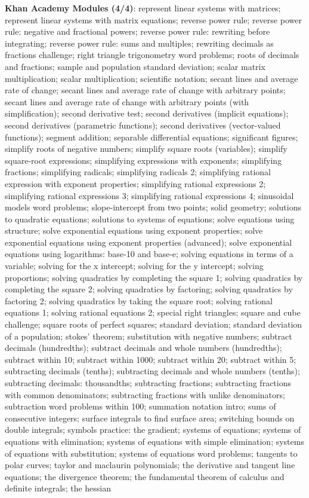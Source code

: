 \documentclass{article}
\begin{document}
\begin{figure*}
\textbf{Khan Academy Modules (4/4)}:
represent linear systems with matrices; represent linear systems with matrix equations; reverse power rule; reverse power rule: negative and fractional powers; reverse power rule: rewriting before integrating; reverse power rule: sums and multiples; rewriting decimals as fractions challenge; right triangle trigonometry word problems; roots of decimals and fractions; sample and population standard deviation; scalar matrix multiplication; scalar multiplication; scientific notation; secant lines and average rate of change; secant lines and average rate of change with arbitrary points; secant lines and average rate of change with arbitrary points (with simplification); second derivative test; second derivatives (implicit equations); second derivatives (parametric functions); second derivatives (vector-valued functions); segment addition; separable differential equations; significant figures; simplify roots of negative numbers; simplify square roots (variables); simplify square-root expressions; simplifying expressions with exponents; simplifying fractions; simplifying radicals; simplifying radicals 2; simplifying rational expression with exponent properties; simplifying rational expressions 2; simplifying rational expressions 3; simplifying rational expressions 4; sinusoidal models word problems; slope-intercept from two points; solid geometry; solutions to quadratic equations; solutions to systems of equations; solve equations using structure; solve exponential equations using exponent properties; solve exponential equations using exponent properties (advanced); solve exponential equations using logarithms: base-10 and base-e; solving equations in terms of a variable; solving for the x intercept; solving for the y intercept; solving proportions; solving quadratics by completing the square 1; solving quadratics by completing the square 2; solving quadratics by factoring; solving quadratics by factoring 2; solving quadratics by taking the square root; solving rational equations 1; solving rational equations 2; special right triangles; square and cube challenge; square roots of perfect squares; standard deviation; standard deviation of a population; stokes' theorem; substitution with negative numbers; subtract decimals (hundredths); subtract decimals and whole numbers (hundredths); subtract within 10; subtract within 1000; subtract within 20; subtract within 5; subtracting decimals (tenths); subtracting decimals and whole numbers (tenths); subtracting decimals: thousandths; subtracting fractions; subtracting fractions with common denominators; subtracting fractions with unlike denominators; subtraction word problems within 100; summation notation intro; sums of consecutive integers; surface integrals to find surface area; switching bounds on double integrals; symbols practice: the gradient; systems of equations; systems of equations with elimination; systems of equations with simple elimination; systems of equations with substitution; systems of equations word problems; tangents to polar curves; taylor and maclaurin polynomials; the derivative and tangent line equations; the divergence theorem; the fundamental theorem of calculus and definite integrals; the hessian 
\end{figure*}
\end{document}
